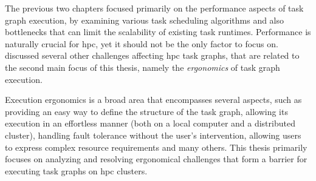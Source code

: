 The previous two chapters focused primarily on the performance aspects of task graph execution, by
examining various task scheduling algorithms and also bottlenecks that can limit the scalability of
existing task runtimes. Performance is naturally crucial for \gls{hpc}, yet it should
not be the only factor to focus on.  discussed several other challenges
affecting \gls{hpc} task graphs, that are related to the second main focus of this
thesis, namely the \emph{ergonomics} of task graph execution.

Execution ergonomics is a broad area that encompasses several aspects, such as providing an easy
way to define the structure of the task graph, allowing its execution in an effortless manner (both
on a local computer and a distributed cluster), handling fault tolerance without the user's
intervention, allowing users to express complex resource requirements and many others. This thesis
primarily focuses on analyzing and resolving ergonomical challenges that form a barrier for
executing task graphs on \gls{hpc} clusters.






